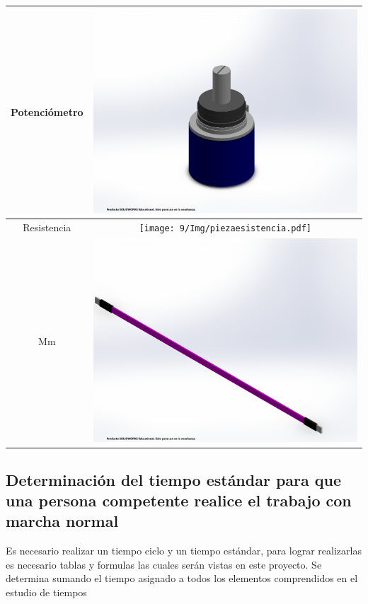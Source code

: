 \begin{table}[H]
\begin{tabular}{|c |c |}
             Potenciómetro & \includegraphics[scale=0.1]{9/Img/piezaPotenciometro.pdf}   \\
        \hline
             Resistencia& \texttt{[image: 9/Img/piezaesistencia.pdf]}  \\
        \hline 
             Mm& \includegraphics[scale=0.1]{9/Img/piezaCableMM.PDF}  \\
        \hline
        \end{tabular}
        \label{tab:inventario}
    \end{table}
    \subsection{Determinación del tiempo estándar para que una persona competente realice el trabajo con marcha normal}
    Es necesario realizar un tiempo ciclo y un tiempo estándar, para lograr realizarlas es necesario tablas y formulas las cuales serán vistas en este proyecto.
    Se determina sumando el tiempo asignado a todos los elementos comprendidos en el estudio de tiempos
    
